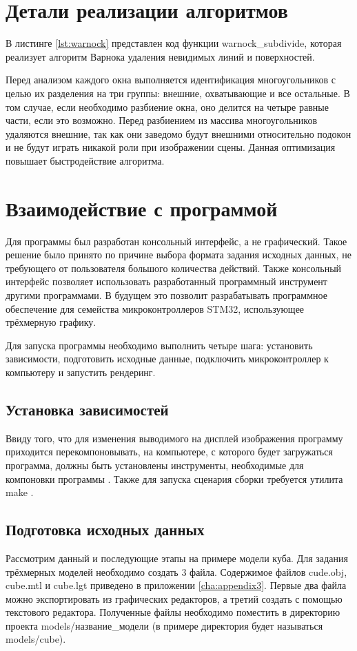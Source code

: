 \section{Детали реализации алгоритмов}
В листинге \ref{lst:warnock} представлен код функции warnock\_subdivide, которая реализует алгоритм Варнока удаления 
невидимых линий и поверхностей.


Перед анализом каждого окна выполняется идентификация многоугольников с целью их разделения на три группы: внешние, 
охватывающие и все остальные. В том случае, если необходимо разбиение окна, оно делится на четыре равные части, если это возможно. 
Перед разбиением из массива многоугольников удаляются внешние, так как они заведомо будут внешними относительно подокон и 
не будут играть никакой роли при изображении сцены. Данная оптимизация повышает быстродействие алгоритма.

\section{Взаимодействие с программой}
Для программы был разработан консольный интерфейс, а не графический. Такое решение было принято по причине выбора формата задания 
исходных данных, не требующего от пользователя большого количества действий. Также консольный интерфейс позволяет использовать 
разработанный программный инструмент другими программами. В будущем это позволит разрабатывать программное обеспечение для семейства 
микроконтроллеров STM32, использующее трёхмерную графику.

Для запуска программы необходимо выполнить четыре шага: установить зависимости, подготовить исходные данные, подключить 
микроконтроллер к компьютеру и запустить рендеринг.

\subsection{Установка зависимостей}
Ввиду того, что для изменения выводимого на дисплей изображения программу приходится перекомпоновывать, на компьютере, с которого 
будет загружаться программа, должны быть установлены инструменты, необходимые для компоновки программы \cite{toolchain}. 
Также для запуска сценария сборки требуется утилита make \cite{make}.

\subsection{Подготовка исходных данных}
Рассмотрим данный и последующие этапы на примере модели куба. Для задания трёхмерных моделей необходимо создать 3 файла. 
Содержимое файлов cude.obj, cube.mtl и cube.lgt приведено в приложении \ref{cha:appendix3}. Первые два файла можно экспортировать 
из графических редакторов, а третий создать с помощью текстового редактора. Полученные файлы необходимо поместить в директорию 
проекта models/название\_модели (в примере директория будет называться models/cube).

